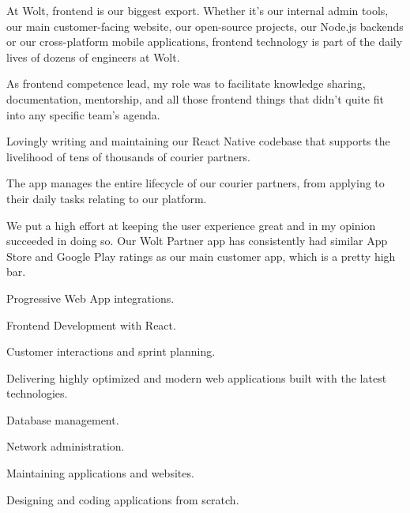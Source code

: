 \documentclass[]{deedy-resume-openfont}
\begin{document}
\begin{tightemize}
\item At Wolt, frontend is our biggest export. Whether it's our internal admin tools, our main customer-facing website, our open-source projects, our Node.js backends or our cross-platform mobile applications, frontend technology is part of the daily lives of dozens of engineers at Wolt.

\item As frontend competence lead, my role was to facilitate knowledge sharing, documentation, mentorship, and all those frontend things that didn't quite fit into any specific team's agenda.
\end{tightemize}
\sectionsep

\begin{tightemize}
\item Lovingly writing and maintaining our React Native codebase that supports the livelihood of tens of thousands of courier partners.
\item The app manages the entire lifecycle of our courier partners, from applying to their daily tasks relating to our platform. 
\item We put a high effort at keeping the user experience great and in my opinion succeeded in doing so. Our Wolt Partner app has consistently had similar App Store and Google Play ratings as our main customer app, which is a pretty high bar.
\end{tightemize}
\sectionsep

\begin{tightemize}
\item Progressive Web App integrations.
\item Frontend Development with React.
\item Customer interactions and sprint planning.
\item Delivering highly optimized and modern web applications built with the latest technologies.
\end{tightemize}
\sectionsep

\begin{tightemize}
\item Database management.
\item Network administration.
\item Maintaining applications and websites.
\item Designing and coding applications from scratch.
\end{tightemize}
\sectionsep
\end{document}
